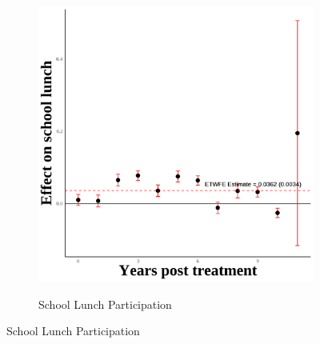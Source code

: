 \documentclass[12pt,english]{article}
\begin{document}
\begin{figure}[H]
\begin{subfigure}[b]{0.3\textwidth}
    \label{fig:ln-schl-lunch-first}
  \end{subfigure}
  \hfill
  \begin{subfigure}[b]{0.3\textwidth}
    \centering
    \caption{School Lunch Participation}
    \includegraphics[width=\linewidth]{figures/plot11-schl_lunch_event_study-first.png}
    \label{fig:schl-lunch-first}
  \end{subfigure}

  \vspace{0.3cm} %


\end{figure}
\end{document}
